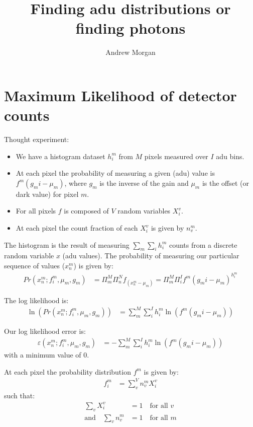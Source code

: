 \documentclass[11pt]{article}
\title{\textbf{Finding adu distributions or finding photons}}
\author{Andrew Morgan}
\date{}
\begin{document}
\maketitle

\section{Maximum Likelihood of detector counts}
Thought experiment:

\begin{itemize}

  \item We have a histogram dataset $h^m_i$ from $M$ pixels measured over $I$ adu bins.
  \item At each pixel the probability of measuring a given (adu) value is $f^m(g_m i - \mu_m)$, where $g_m$ is the inverse of the gain and $\mu_m$ is the offset (or dark value) for pixel $m$. 
  \item For all pixels $f$ is composed of $V$ random variables $X^v_i$.
  \item At each pixel the count fraction of each $X^v_i$ is given by $n^m_v$.
\end{itemize}

The histogram is the result of measuring $\sum_m \sum_i h^m_i$ counts from a discrete random variable $x$ (adu values).
The probability of measuring our particular sequence of values ($ x^m_n $) is given by:
\begin{align}
   Pr(x^m_n; f^m_i, \mu_m, g_m) &= \Pi_m^M \Pi_n^N f_(x^m_n - \mu_m) = \Pi_m^M \Pi_i^I f^m(g_m i - \mu_m)^{h^m_i}
\end{align}

The log likelihood is:
\begin{align}
   \ln(Pr(x^m_n; f^m_i, \mu_m, g_m)) &= \sum_m^M \sum_i^I h^m_i \ln(f^m(g_m i - \mu_m))
\end{align}

Our log likelihood error is:
\begin{align}
   \varepsilon(x^m_n; f^m_i, \mu_m, g_m) &= -\sum_m^M \sum_i^I h^m_i \ln(f^m(g_m i - \mu_m))
\end{align}
with a minimum value of 0. 

At each pixel the probability distribution $f^m$ is given by:
\begin{align}
   f^m_i &= \sum_v^V n^m_v X^v_i 
\end{align}
such that:
\begin{align}
   \sum_v X^v_i &= 1 \quad \text{for all } v \\
   \text{and} \quad \sum_v n^m_v &= 1  \quad \text{for all } m 
\end{align}
\end{document}
